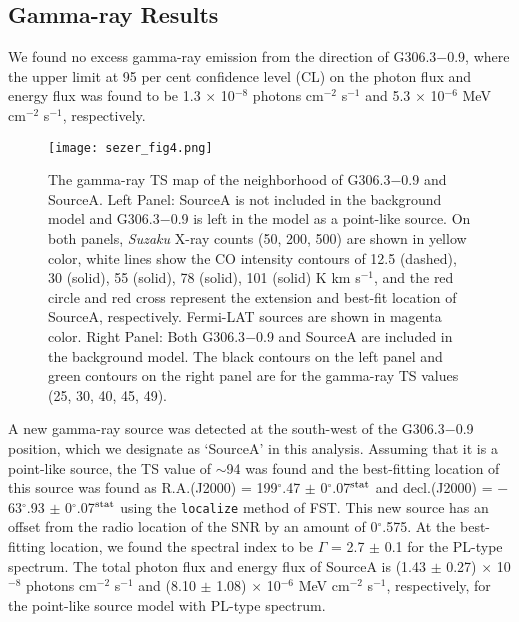 \documentclass[useAMS,usenatbib]{mn2e}
\begin{document}
\subsection{Gamma-ray Results} \label{subsection:Gamma-rayResults}
We found no excess gamma-ray emission from the direction of G306.3$-$0.9, where the upper limit at 95 per cent confidence level (CL) on the photon flux and energy flux was found to be 1.3 $\times$ 10$^{-8}$ photons cm$^{-2}$ s$^{-1}$ and 5.3 $\times$ 10$^{-6}$ MeV cm$^{-2}$ s$^{-1}$, respectively. 

\begin{figure*}
\centering \vspace*{1pt}
\texttt{[image: sezer\_fig4.png]}
\caption{The gamma-ray TS map of the neighborhood of G306.3$-$0.9 and SourceA. Left Panel: SourceA is not included in the background model and G306.3$-$0.9 is left in the model as a point-like source. On both panels, {\it Suzaku} X-ray counts (50, 200, 500) are shown in yellow color, white lines show the CO intensity contours of 12.5 (dashed), 30 (solid), 55 (solid), 78 (solid), 101 (solid) K km s$^{-1}$, and the red circle and red cross represent the extension and best-fit location of SourceA, respectively. Fermi-LAT sources are shown in magenta color. Right Panel: Both G306.3$-$0.9 and SourceA are included in the background model. The black contours on the left panel and green contours on the right panel are for the gamma-ray TS values (25, 30, 40, 45, 49).}
\label{gfigure_2}
\end{figure*}

A new gamma-ray source was detected at the south-west of the G306.3$-$0.9 position, which we designate as `SourceA' in this analysis. Assuming that it is a point-like source, the TS value of $\sim$94 was found and the best-fitting location of this source was found as R.A.(J2000) = 199$^{\circ}\!\!$.47 $\pm$ 0$^{\circ}\!\!$.07$^{\rm stat}$ and decl.(J2000) = $-$63$^{\circ}\!\!$.93 $\pm$ 0$^{\circ}\!\!$.07$^{\rm stat}$ using the \texttt{localize} method of FST. This new source has an offset from the radio location of the SNR by an amount of 0$^{\circ}\!\!$.575. At the best-fitting location, we found the spectral index to be $\Gamma$ = 2.7 $\pm$ 0.1 for the PL-type spectrum. The total photon flux and energy flux of SourceA is (1.43 $\pm$ 0.27) $\times$ 10$^{-8}$ photons cm$^{-2}$ s$^{-1}$ and (8.10 $\pm$ 1.08) $\times$ 10$^{-6}$ MeV cm$^{-2}$ s$^{-1}$, respectively, for the point-like source model with PL-type spectrum. 
\end{document}
